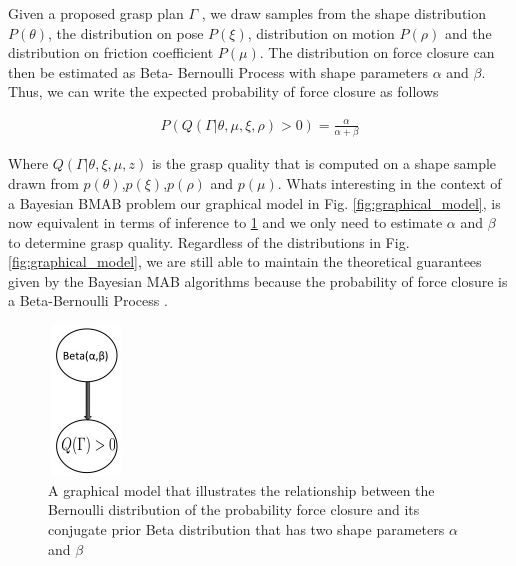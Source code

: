 \documentclass[journal,transmag]{IEEEtran}%
\begin{document}
Given a proposed grasp plan $\Gamma$ , we draw samples from the shape distribution $P(\theta)$, the distribution on pose $P(\xi)$, distribution on motion $P(\rho)$ and the distribution on friction coefficient $P(\mu)$.
The distribution on force closure can then be estimated as Beta- Bernoulli Process with shape parameters $\alpha$ and $\beta$.
Thus, we can write the expected probability of force closure as follows

\vspace{-2ex}
\begin{align}\label{eq:shape_sampling}
P(Q(\Gamma|\theta,\mu,\xi,\rho) > 0) = \frac{\alpha}{\alpha + \beta}
\end{align}

Where $Q(\Gamma|\theta,\xi,\mu,z)$ is the grasp quality that is computed on a shape sample drawn from $p(\theta)$,$p(\xi)$,$p(\rho)$ and $p(\mu)$.
Whats interesting in the context of a Bayesian BMAB problem our graphical model in Fig. \ref{fig:graphical_model}, is now equivalent in terms of inference to \ref{fig:beta_model} and we only need to estimate $\alpha$ and $\beta$ to determine grasp quality.
Regardless of the distributions in Fig. \ref{fig:graphical_model}, we are still able to maintain the theoretical guarantees given by the Bayesian MAB algorithms because the probability of force closure is a Beta-Bernoulli Process \cite{agrawal2011analysis} \cite{kaufmann2012bayesian} 
\cite{weber1992gittins}. 


\begin{figure}[ht!]
\centering
\includegraphics[width = 2cm, height = 4cm]{figures/Slide9.jpg}
\caption{A graphical model that illustrates the relationship between the Bernoulli distribution of the probability force closure and its conjugate prior Beta distribution that has two shape parameters $\alpha$ and $\beta$ }
\vspace*{-10pt}
\label{fig:beta_model}
\end{figure}
\end{document}
